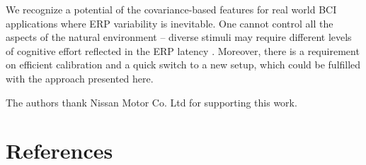 \documentclass[12pt]{iopart}
\begin{document}

We recognize a potential of the covariance-based features
for real world BCI applications where ERP variability is inevitable. 
One cannot control all the aspects of the natural environment --
diverse stimuli may require different levels of cognitive
effort reflected in the ERP latency \cite{kutas_augmenting_1977}.
Moreover, there is a requirement on efficient calibration and 
a quick switch to a new setup, which could be fulfilled with the approach presented here. 

\ack

The authors thank Nissan Motor Co. Ltd for supporting
this work.

\section*{References}


%

\end{document}
